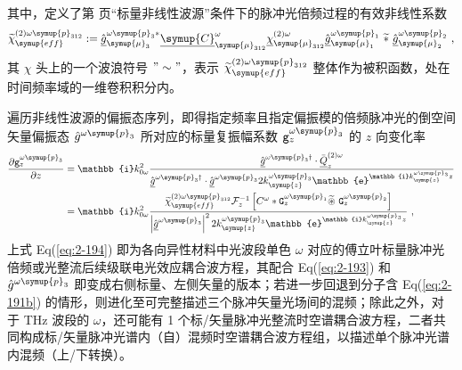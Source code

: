 其中，定义了第 \pageref{con:3} 页“标量非线性波源”条件下的脉冲光倍频过程的有效非线性系数
\begin{equation} \label{eq:2-193}
	\abovedisplayskip=13pt
	\belowdisplayskip=13pt
	\widetilde{\chi}^{(2)\omega\symup{p}_{312}}_{\symup{eff}} := \hat{\underline{g}}^{\omega\symup{p}_{3}*}_{{\symup{\mu}}_{3}} \underline{\symup{C}}^{\omega}_{{\symup{\mu}}_{312}} \underline{\chi}^{(2)\omega}_{{\symup{\mu}}_{312}} \hat{\underline{g}}^{\omega\symup{p}_{1}}_{{\symup{\mu}}_1} \ \widetilde *\ \hat{\underline{g}}^{\omega\symup{p}_{2}}_{{\symup{\mu}}_2} ~,
\end{equation}
其 $\chi$ 头上的一个波浪符号 $"\sim"$，表示 $\widetilde{\chi}^{(2)\omega\symup{p}_{312}}_{\symup{eff}}$ 整体作为被积函数，处在时间频率域的一维卷积积分内。

遍历非线性波源的偏振态序列，即得指定频率且指定偏振模的倍频脉冲光的倒空间矢量偏振态 $\hat{g}^{\omega\symup{p}_{3}}$ 所对应的标量复振幅系数 ${\mathtt{g}}^{\omega\symup{p}_{3}}_{z}$ 的 $z$ 向变化率
\begin{subequations} \label{eq:2-194}
	\abovedisplayskip=13pt
	\belowdisplayskip=13pt
	\begin{align}
		\displaystyle{\frac{\partial {\mathtt{g}}^{\omega\symup{p}_{3}}_{z}}{\partial z}} &= \mathbb{i} k^{2}_{0\omega} \frac{ \hat{\underline{g}}^{\omega\symup{p}_{3}\dag} \cdot \bar{\underline{Q}}^{(2)\omega}_{z} }{ \hat{\underline{g}}^{\omega\symup{p}_{3}\dag} \cdot \hat{\underline{g}}^{\omega\symup{p}_{3}} 2 k^{\omega\symup{p}_{3}}_{\symup{z}} \mathbb{e}^{\mathbb{i} k^{\omega\symup{p}_{3}}_{\symup{z}} z} } \label{eq:2-194a} \\ &= \mathbb{i} k^{2}_{0\omega} \frac{ \widetilde{\chi}^{(2)\omega\symup{p}_{312}}_{\symup{eff}} \mathcal F^{-1}_{z} \left[ C^{\omega} * {\mathtt{G}}^{\omega{\symup{p}}_{1}}_{z} \widetilde \circledast\ {\mathtt{G}}^{\omega{\symup{p}}_{2}}_{z} \right] }{ \left| \hat{\underline{g}}^{\omega\symup{p}_{3}} \right|^2 2 k^{\omega\symup{p}_{3}}_{\symup{z}} \mathbb{e}^{\mathbb{i} k^{\omega\symup{p}_{3}}_{\symup{z}} z} } \label{eq:2-194b}~,
	\end{align}
\end{subequations}
上式 Eq(\ref{eq:2-194}) 即为各向异性材料中光波段单色 $\omega$ 对应的傅立叶标量脉冲光倍频或光整流后续级联电光效应耦合波方程，其配合 Eq(\ref{eq:2-193}) 和 $\hat{g}^{\omega\symup{p}_{3}}$ 即变成右侧标量、左侧矢量的版本；若进一步回退到分子含 Eq(\ref{eq:2-191b}) 的情形，则进化至可完整描述三个脉冲矢量光场间的混频；除此之外，对于 THz 波段的 $\omega$，还可能有 1 个标/矢量脉冲光整流时空谱耦合波方程，二者共同构成标/矢量脉冲光谱内（自）混频时空谱耦合波方程组，以描述单个脉冲光谱内混频（上/下转换）。
  
